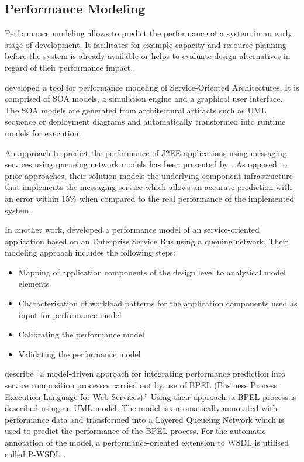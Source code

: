\subsection{Performance Modeling}
Performance modeling allows to predict the performance of a system in an early stage of development. It facilitates for example capacity and resource planning before the system is already available or helps to evaluate design alternatives in regard of their performance impact.

\citet{Brebner:2008uq} developed a tool for performance modeling of Service-Oriented Architectures. It is comprised of SOA models, a simulation engine and a graphical user interface. The SOA models are generated from architectural artifacts such as UML sequence or deployment diagrams and automatically transformed into runtime models for execution.

An approach to predict the performance of J2EE applications using messaging services using queueing network models has been presented by \citet{Liu:2005zr}. As opposed to prior approaches, their solution models the underlying component infrastructure that implements the messaging service which allows an accurate prediction with an error within 15\% when compared to the real performance of the implemented system.

In another work, \citet{Liu:2007vn} developed a performance model of an service-oriented application based on an Enterprise Service Bus using a queuing network. Their modeling approach includes the following steps:
\begin{itemize}
	\item Mapping of application components of the design level to analytical model elements
	\item Characterisation of workload patterns for the application components used as input for performance model
	\item Calibrating the performance model
	\item Validating the performance model
\end{itemize}

\citet{DAmbrogio:2007ly} describe ``a model-driven approach for integrating performance prediction into service composition processes carried out by use of BPEL (Business Process Execution Language for Web Services).'' Using their approach, a BPEL process is described using an UML model. The model is automatically annotated with performance data and transformed into a Layered Queueing Network which is used to predict the performance of the BPEL process. For the automatic annotation of the model, a performance-oriented extension to WSDL is utilised called P-WSDL \citep{D-Ambrogio:2005ve}.

